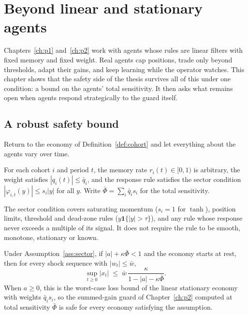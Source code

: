 \chapter{Beyond linear and stationary agents}\label{ch:beyondlinear}

Chapters~\ref{ch:p1} and~\ref{ch:p2} work with agents whose rules are linear filters with fixed memory and fixed weight. Real agents cap positions, trade only beyond thresholds, adapt their gains, and keep learning while the operator watches. This chapter shows that the safety side of the thesis survives all of this under one condition: a bound on the agents' total sensitivity. It then asks what remains open when agents respond strategically to the guard itself.

\section{A robust safety bound}\label{sec:bl_robust}

Return to the economy of Definition~\ref{def:cohort} and let everything about the agents vary over time.

\begin{assumption}\label{ass:sector}
For each cohort $i$ and period $t$, the memory rate $r_i(t)\in[0,1)$ is arbitrary, the weight satisfies $|q_i(t)|\le\bar q_i$, and the response rule satisfies the sector condition $|\varphi_{i,t}(y)|\le s_i|y|$ for all $y$. Write $\bar\Phi=\sum_i\bar q_i s_i$ for the total sensitivity.
\end{assumption}

The sector condition covers saturating momentum ($s_i=1$ for $\tanh$), position limits, threshold and dead-zone rules ($y\mathbf 1\{|y|>\tau\}$), and any rule whose response never exceeds a multiple of its signal. It does not require the rule to be smooth, monotone, stationary or known.

\begin{theorem}\label{thm:sector}
Under Assumption~\ref{ass:sector}, if $|a|+\kappa\bar\Phi<1$ and the economy starts at rest, then for every shock sequence with $|w_t|\le\bar w$,
\[
\sup_{t\ge0}|x_t|\;\le\;\bar w\,\frac{\kappa}{1-|a|-\kappa\bar\Phi}.
\]
When $a\ge0$, this is the worst-case loss bound of the linear stationary economy with weights $\bar q_is_i$, so the summed-gain guard of Chapter~\ref{ch:p2} computed at total sensitivity $\bar\Phi$ is safe for every economy satisfying the assumption. \hfill\Proved
\end{theorem}

